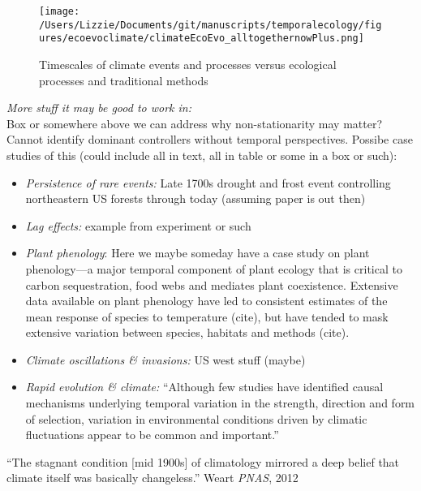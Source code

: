 \documentclass[11pt,a4paper]{article}
\newenvironment{smitemize}{
\begin{itemize}
  \setlength{\itemsep}{1pt}
  \setlength{\parskip}{0pt}
  \setlength{\parsep}{0pt}}
{\end{itemize}
}
\newcommand*\dashme{\item[--]}
\begin{document}
\newpage
\begin{figure}[h!]
\centering
\noindent \texttt{[image: /Users/Lizzie/Documents/git/manuscripts/temporalecology/figures/ecoevoclimate/climateEcoEvo\_alltogethernowPlus.png]}
\caption{Timescales of climate events and processes versus ecological processes and traditional methods \label{climatescalesfig}}
\end{figure}

\clearpage
\newpage
\noindent \emph{More stuff it may be good to work in:}\\
\noindent Box or somewhere above we can address why non-stationarity may matter? \\
Cannot identify dominant controllers without temporal perspectives. Possibe case studies of this (could include all in text, all in table or some in a box or such):
\begin{smitemize}
\dashme \emph{Persistence of rare events:} Late 1700s drought and frost event controlling northeastern US forests through today (assuming paper is out then)
\dashme \emph{Lag effects:} example from experiment or such
\dashme \emph{Plant phenology}: Here we maybe someday have a case study on plant phenology---a major temporal component of plant ecology that is critical to carbon sequestration, food webs and mediates plant coexistence. Extensive data available on plant phenology have led to consistent estimates of the mean response of species to temperature (cite), but have tended to mask extensive variation between species, habitats and methods (cite). 
\dashme \emph{Climate oscillations \& invasions:} US west stuff (maybe)
\dashme \emph{Rapid evolution \& climate:} ``Although few studies
have identified causal mechanisms underlying temporal variation in the strength,
direction and form of selection, variation in environmental conditions driven by climatic fluctuations appear to be common and important.'' \citep{Siepielski:2009ti}
\end{smitemize}
``The stagnant condition [mid 1900s] of climatology mirrored a deep belief
that climate itself was basically changeless.'' Weart \emph{PNAS}, 2012\\
\end{document}
